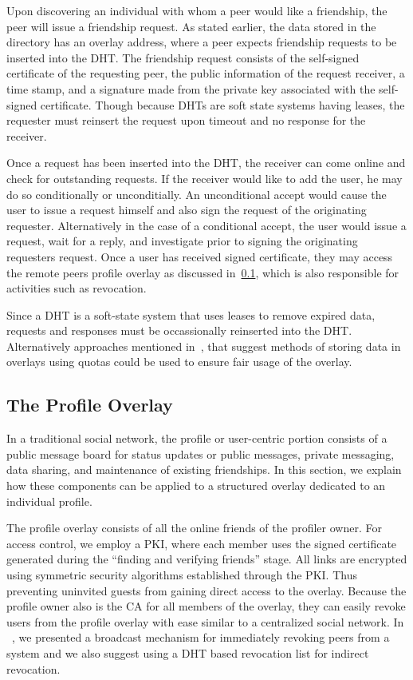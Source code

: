 \documentclass[letterpaper,twocolumn,10pt]{article}
\begin{document}
Upon discovering an individual with whom a peer would like a friendship, the
peer will issue a friendship request.  As stated earlier, the data stored in
the directory has an overlay address, where a peer expects friendship requests
to be inserted into the DHT.  The friendship request consists of the self-signed
certificate of the requesting peer, the public information of the request
receiver, a time stamp, and a signature made from the private key associated with
the self-signed certificate.  Though because DHTs are soft state systems having
leases, the requester must reinsert the request upon timeout and no response for
the receiver.

Once a request has been inserted into the DHT, the receiver can come online and
check for outstanding requests.  If the receiver would like to add the user, he
may do so conditionally or unconditially.  An unconditional accept would cause
the user to issue a request himself and also sign the request of the originating
requester.  Alternatively in the case of a conditional accept, the user would
issue a request, wait for a reply, and investigate prior to signing the originating
requesters request.  Once a user has received signed certificate, they may access
the remote peers profile overlay as discussed in~\ref{profile_overlay}, which is
also responsible for activities such as revocation.

Since a DHT is a soft-state system that uses leases to remove expired data, requests
and responses must be occassionally reinserted into the DHT.  Alternatively
approaches mentioned in~\cite{}, that suggest methods of storing data in overlays
using quotas could be used to ensure fair usage of the overlay.

\subsection{The Profile Overlay}
\label{profile_overlay} In a traditional social network, the profile or
user-centric portion consists of a public message board for status updates or
public messages, private
messaging, data sharing, and maintenance of existing friendships.  In this
section, we explain how these components can be applied to a structured overlay
dedicated to an individual profile.

The profile overlay consists of all the online friends of the profiler owner.
For access control, we employ a PKI, where each member uses the signed certificate
generated during the ``finding and verifying friends'' stage.  All links are
encrypted using symmetric security algorithms established through the PKI.
Thus preventing uninvited guests from gaining direct access to the overlay.
Because the profile owner also is the CA for all members of the overlay, they
can easily revoke users from the profile overlay with ease similar to a
centralized social network.  In ~\cite{icdcs}, we presented a broadcast mechanism
for immediately revoking peers from a system and we also suggest using a DHT based
revocation list for indirect revocation.
\end{document}
